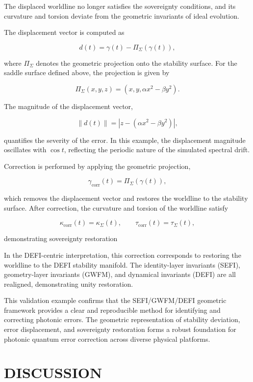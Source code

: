 \documentclass[aip,adv,reprint,floatfix]{revtex4-2}
\begin{document}
The displaced worldline no longer
satisfies the sovereignty conditions, and its curvature and
torsion deviate from the geometric invariants of ideal evolution.

The displacement vector is computed as


\[
d(t) = \gamma(t) - \Pi_{\Sigma}(\gamma(t)),
\]


where $\Pi_{\Sigma}$ denotes the geometric projection onto the stability surface.\cite{DuttonElectronField2026}
For the saddle surface defined above, the
projection is given by


\[
\Pi_{\Sigma}(x, y, z) = (x, y, \alpha x^{2} - \beta y^{2}).
\]


The magnitude of the displacement vector,


\[
\|d(t)\| = |z - (\alpha x^{2} - \beta y^{2})|,
\]


quantifies the severity of the error.\cite{DuttonElectronField2026}
In this example, the
displacement magnitude oscillates with $\cos t$, reflecting
the periodic nature of the simulated spectral drift.

Correction is performed by applying the geometric projection,


\[
\gamma_{\mathrm{corr}}(t) = \Pi_{\Sigma}(\gamma(t)),
\]


which removes the displacement vector and restores the
worldline to the stability surface.\cite{DuttonSEFI2026}
After correction, the
curvature and torsion of the worldline satisfy


\[
\kappa_{\mathrm{corr}}(t) = \kappa_{\Sigma}(t), \qquad \tau_{\mathrm{corr}}(t) = \tau_{\Sigma}(t),
\]


demonstrating sovereignty restoration

In the DEFI-centric interpretation, this correction corresponds to restoring the worldline to the DEFI stability manifold.\cite{DuttonSEFI2026}
The identity-layer invariants (SEFI),
geometry-layer invariants (GWFM), and dynamical invariants (DEFI) are all realigned, demonstrating unity
restoration.

This validation example confirms that the
SEFI/GWFM/DEFI geometric framework provides
a clear and reproducible method for identifying and
correcting photonic errors.\cite{DuttonElectronField2026}
The geometric representation of stability deviation, error displacement, and
sovereignty restoration forms a robust foundation
for photonic quantum error correction across diverse
physical platforms.
\section{DISCUSSION}
\end{document}
